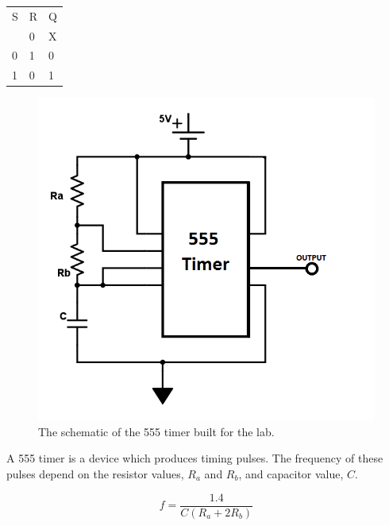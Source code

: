 \documentclass[twocolumn, amsmath]{revtex4}
\begin{document}
\begin{center}
	\begin{ruledtabular}
    \begin{tabular}{ l l l}
	S & R & Q\\ \colrule
	0 & 0 & X \\
	0 & 1 & 0 \\
	1 & 0 & 1
\end{tabular}
    \end{ruledtabular}
\end{center}

 

\begin{figure}[h]
    \includegraphics[scale=0.25]{555.png}  
    \caption{The schematic of the 555 timer built for the lab.}
\end{figure}

A 555 timer is a device which produces timing pulses. The frequency of these pulses depend on the resistor values, $R_a$ and $R_b$, and capacitor value, $C$.

\begin{equation}
f = \frac{1.4}{C(R_a + 2R_b)}
\end{equation}
\end{document}
